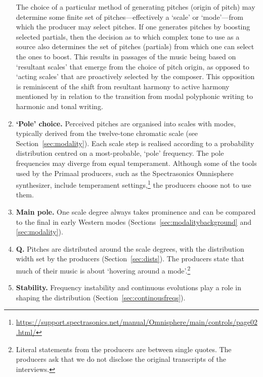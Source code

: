 \documentclass{article}
\begin{document}
\begin{enumerate}[label={(\arabic*)}]
The choice of a particular method of generating pitches (origin of pitch) may determine some finite set of pitches---effectively a `scale' or `mode'---from which the producer may select pitches. If one generates pitches by boosting selected partials, then the decision as to which complex tone to use as a source also determines the set of pitches (partials) from which one can select the ones to boost. This results in passages of the music being based on `resultant scales' that emerge from the choice of pitch origin, as opposed to `acting scales' that are proactively selected by the composer. This opposition is reminiscent of the shift from resultant harmony to active harmony mentioned by \citet[p.~82]{coeurdevey1998histoire} in relation to the transition from modal polyphonic writing to harmonic and tonal writing.
    
    \item {\bfseries `Pole' choice.} Perceived pitches are organised into scales with modes, typically derived from the twelve-tone chromatic scale (see Section~\ref{sec:modality}). Each scale step is realised according to a probability distribution centred on a most-probable, `pole' frequency. The pole frequencies may diverge from equal temperament. Although some of the tools used by the Primaal producers, such as the Spectrasonics Omnisphere synthesizer, include temperament settings,\footnote{\url{https://support.spectrasonics.net/manual/Omnisphere/main/controls/page02.html/}} the producers choose not to use them.  

    \item {\bfseries Main pole.} One scale degree always takes prominence and can be compared to the final in early Western modes (Sections~\ref{sec:modalitybackground} and \ref{sec:modality}).


    
    \item {\bfseries Q.} Pitches are distributed around the scale degrees, with the distribution width set by the producers (Section~\ref{sec:dists}). The producers state that much of their music is about `hovering around a mode'.\footnote{Literal statements from the producers are between single quotes. The producers ask that we do not disclose the original transcripts of the interviews.}
    
    \item {\bfseries Stability.} Frequency instability and continuous evolutions play a role in shaping the distribution (Section~\ref{sec:continousfreqs}).
    

\end{enumerate}
\end{document}
